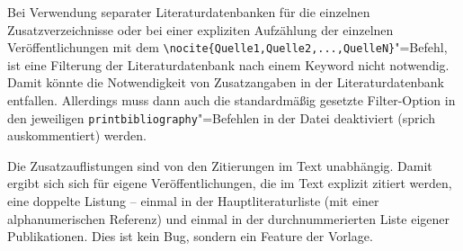Bei Verwendung separater Literaturdatenbanken für die einzelnen Zusatzverzeichnisse
oder bei einer expliziten Aufzählung der einzelnen Veröffentlichungen mit dem
\lstinline|\nocite{Quelle1,Quelle2,...,QuelleN}|"=Befehl,
ist eine Filterung der Literaturdatenbank nach einem Keyword nicht notwendig.
Damit könnte die Notwendigkeit von Zusatzangaben in der Literaturdatenbank entfallen.
Allerdings muss dann auch die standardmäßig gesetzte Filter-Option in den jeweiligen
\lstinline|printbibliography|"=Befehlen
in der Datei  
deaktiviert (sprich auskommentiert) werden.

Die Zusatzauflistungen sind von den Zitierungen im Text unabhängig.
Damit ergibt sich sich für eigene Veröffentlichungen,
die im Text explizit zitiert werden, eine doppelte Listung --
einmal in der Hauptliteraturliste (mit einer alphanumerischen Referenz)
und einmal in der durchnummerierten Liste eigener Publikationen.
Dies ist kein Bug, sondern ein Feature der Vorlage.